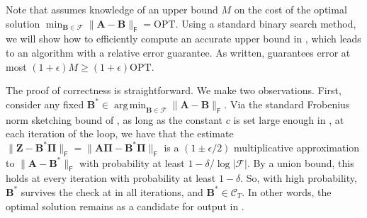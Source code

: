 \documentclass{article}[11pt]
\theoremstyle{definition}
\newcommand{\algrule}[1][.2pt]{\par\vskip.2\baselineskip\hrule height #1\par\vskip.2\baselineskip}
\newcommand{\bv}[1]{\boldsymbol{\mathbf{#1}}}
\newcommand{\Fro}{\mathsf{F}}
\newcommand{\F}{\mathcal{F}}
\newcommand{\OPT}{\mathrm{OPT}}
\DeclareMathOperator*{\argmin}{arg\,min}
\begin{document}
    \begin{algorithm}[H]
        \caption{One-Sided Iterative Candidate Refinement}\label{alg:one_side_refinement}    
    \end{algorithm}    

    Note that 
    assumes knowledge of an upper bound $M$ on the cost of the optimal solution $\min_{\bv{B}\in \F} \|\bv{A} - \bv{B}\|_\Fro = \OPT$. Using a standard binary search method, we will show how to efficiently compute an accurate upper bound in , which leads to an algorithm with a relative error guarantee. As written,  guarantees error at most $(1+\epsilon)M \geq (1+\epsilon)\OPT$.

    The proof of correctness is straightforward. We make two observations. First, consider any fixed $\bv{B}^* \in \argmin_{\bv{B}\in \F} \|\bv{A} - \bv{B}\|_\Fro$. Via the standard Frobenius norm sketching bound of , as long as the constant $c$ is set large enough in , at each iteration of the loop, we have that the estimate $\|\bv{Z} - \bv{B}^*\bv{\Pi}\|_\Fro = \|\bv{A}\bv{\Pi} -\bv{B}^*\bv{\Pi}\|_\Fro$ is a $(1\pm \epsilon/2)$ multiplicative approximation to $\|\bv{A} - \bv{B}^*\|_\Fro$ with probability at least $1 - \delta / \log |\F|$. By a union bound, this holds at every iteration with probability at least $1-\delta$. So,  with high probability, $\bv{B}^*$ survives the check at  in all iterations, and $\bv{B}^* \in \mathcal{C}_{T}$. In other words, the optimal solution remains as a candidate for output in .
    
\end{document}
